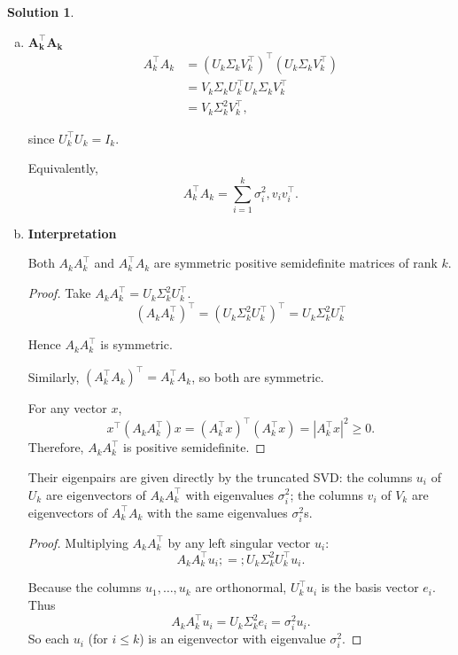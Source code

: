 \documentclass{amsart}[11pt]
\theoremstyle{definition}
\newtheorem*{solution}{Solution}
\begin{document}
\begin{solution}
\begin{enumerate}[(a)]
            \item
            
            $\mathbf{A_k^\top A_k}$
            \[
                \begin{aligned}
                A_k^\top A_k &= (U_k\Sigma_k V_k^\top)^\top(U_k\Sigma_k V_k^\top)\\
                &= V_k\Sigma_k U_k^\top U_k\Sigma_k V_k^\top \\
                &= V_k\Sigma_k^2 V_k^\top,
                \end{aligned}
            \]
            
            since $U_k^\top U_k=I_k$.
            
            Equivalently,
            \[
            A_k^\top A_k=\sum_{i=1}^k \sigma_i^2,v_i v_i^\top.
            \]
            \item \textbf{Interpretation}
            
                Both $A_kA_k^\top$ and $A_k^\top A_k$ are symmetric positive semidefinite matrices of rank $k$.
                \begin{proof}
                    Take $A_k A_k^\top = U_k \Sigma_k^2 U_k^\top.$
                    \[
                        (A_kA_k^\top)^\top = (U_k \Sigma_k^2 U_k^\top)^\top = U_k \Sigma_k^2 U_k^\top
                    \]
                    
                    Hence $A_kA_k^\top$ is symmetric.
                    
                    Similarly,
                    $(A_k^\top A_k)^\top = A_k^\top A_k$,
                    so both are symmetric.

                    For any vector $x$,
                \[
                x^\top (A_kA_k^\top) x = (A_k^\top x)^\top (A_k^\top x) = |A_k^\top x|^2 \ge 0.
                \]
                Therefore, $A_kA_k^\top$ is positive semidefinite.
                \end{proof}


            
            Their eigenpairs are given directly by the truncated SVD: the columns $u_i$ of $U_k$ are eigenvectors of $A_kA_k^\top$ with eigenvalues $\sigma_i^2$; the columns $v_i$ of $V_k$ are eigenvectors of $A_k^\top A_k$ with the same eigenvalues $\sigma_i^2$s.
            \begin{proof}
                Multiplying $A_k A_k^\top$ by any left singular vector $u_i$:
                \[
                  A_k A_k^\top u_i ;=; U_k \Sigma_k^2 U_k^\top u_i.
                \]

                Because the columns $u_1,\dots,u_k$ are orthonormal, $U_k^\top u_i$ is the basis vector $e_i$. Thus
              \[
              A_k A_k^\top u_i = U_k \Sigma_k^2 e_i = \sigma_i^2 u_i.
              \]
              So each $u_i$ (for $i\le k$) is an eigenvector with eigenvalue $\sigma_i^2$.
            \end{proof}

        \end{enumerate}

        

\end{solution}
\end{document}
